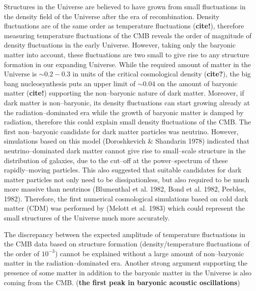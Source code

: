 \documentclass[paper=a4, fontsize=11pt]{scrartcl} %
\numberwithin{equation}{section} %
\numberwithin{figure}{section} %
\numberwithin{table}{section} %
\newcommand{\ignore}[1]{}
\begin{document}
\ignore{One very convincing evidence for the presence and amount of dark matter in our Universe is from the fluctuations of the CMB. Quote the cosmological density fractions for dark matter, baryon, and the Hubble constant for the latest Planck paper.}
Structures in the Universe are believed to have grown from small fluctuations in the density field of the Universe after the era of recombination. Density fluctuations are of the same order as temperature fluctuations ({\bf cite!})\ignore{\bf why? look back in the structure formation part!}, therefore measuring temperature fluctuations of the CMB reveals the order of magnitude of density fluctuations in the early Universe. However, taking only the baryonic matter into account, these fluctuations are two small to give rise to any structure formation in our expanding Universe. While the required amount of matter in the Universe is $\sim 0.2 - 0.3$ in units of the critical cosmological density ({\bf cite?}), the big bang nucleosynthesis puts an upper limit of $\sim 0.04$ on the amount of baryonic matter ({\bf cite!}) supporting the non--baryonic nature of dark matter. Moreover, if dark matter is non--baryonic, its density fluctuations can start growing already at the radiation--dominated era while the growth of baryonic matter is damped by radiation, therefore this could explain small density fluctuations of the CMB.
The first non--baryonic candidate for dark matter particles was neutrino. However, simulations based on this model (Doroshkevich \& Shandarin 1978) indicated that neutrino--dominated dark matter cannot give rise to small--scale structure in the distribution of galaxies, due to the cut--off at the power--spectrum of these rapidly--moving particles. This also suggested that suitable candidates for dark matter particles not only need to be dissipationless, but also required to be much more massive than neutrinos (Blumenthal et al. 1982, Bond et al. 1982, Peebles, 1982). Therefore, the first numerical cosmological simulations based on cold dark matter (CDM) was performed by (Melott et al. 1983) which could represent the small structures of the Universe much more accurately.

The discrepancy between the expected amplitude of temperature fluctuations in the CMB data based on structure formation (density/temperature fluctuations of the order of $10^{-3}$) cannot be explained without a large amount of non--baryonic matter in the radiation--dominated era. Another strong argument supporting the presence of some matter in addition to the baryonic matter in the Universe is also coming from the CMB. ({\bf the first peak in baryonic acoustic oscillations})
\end{document}
